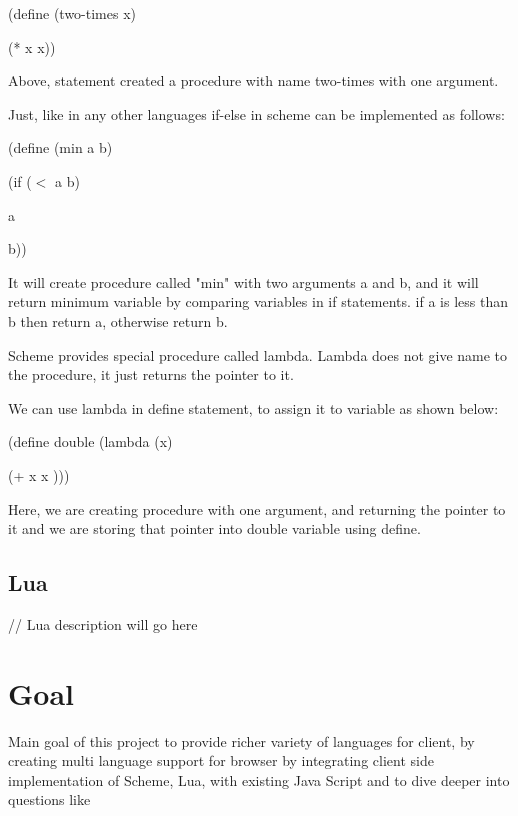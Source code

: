 \begin{center}
	(define (two-times x)
	
	(* x x))
\end{center}

Above, statement created a procedure with name two-times with one argument. 

Just, like in any other languages if-else in scheme can be implemented as follows:

\begin{center}
	
	(define (min a b)
	
	(if ($<$ a b)
	
		a
		
		b))
	
\end{center}

It will create procedure called "min" with two arguments a and b, and it will return minimum variable by comparing variables in if statements. if a is less than b then return a, otherwise return b.

Scheme provides special procedure called lambda. Lambda does not give name to the procedure, it just returns the pointer to it.

We can use lambda in define statement, to assign it to variable as shown below:

\begin{center}
	(define double (lambda (x)
	
	   (+ x x )))
 
\end{center}


Here, we are creating procedure with one argument, and returning the pointer to it and we are storing that pointer into double variable using define.	 

\subsection{Lua}

// Lua description will go here

\section{Goal}


Main goal of this project to provide richer variety of languages for client, by creating multi language support for browser by integrating client side implementation of Scheme, Lua, with existing Java Script and to dive deeper into questions like 

